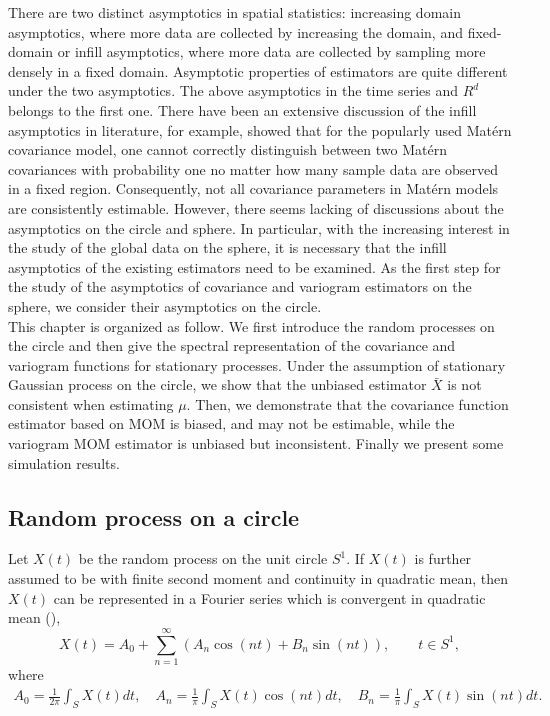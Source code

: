 There are two distinct asymptotics in spatial statistics: increasing domain asymptotics, where more data are collected by increasing the domain, and fixed-domain or infill asymptotics, where more data are collected by sampling more densely in a fixed domain. Asymptotic properties of estimators are quite different under the two asymptotics. The above asymptotics in the time series and $R^d$ belongs to the first one. There have been an extensive discussion of the infill asymptotics in literature, for example, \cite{Zhang:2004:IEA} showed that for the popularly used Mat\'{e}rn covariance model, one cannot correctly distinguish between two Mat\'{e}rn covariances with probability one no matter how many sample data are observed in a fixed region. Consequently, not all covariance parameters in Mat\'{e}rn models are consistently estimable. However, there seems lacking of discussions about the asymptotics on the circle and sphere. In particular, with the increasing interest in the study of the global data on the sphere, it is necessary that the infill asymptotics of the existing estimators need to be examined. As the first step for the study of the asymptotics of covariance and variogram estimators on the sphere, we consider their asymptotics on the circle. \\

This chapter is organized as follow. We first introduce the random processes on the circle and then give the spectral representation of the covariance and variogram functions for stationary processes. Under the assumption of stationary Gaussian process on the circle, we show that the unbiased estimator $\bar{X}$ is not consistent when estimating $\mu$. Then, we demonstrate that the covariance function estimator based on MOM is biased, and may not be estimable, while the variogram MOM estimator is unbiased but inconsistent. Finally we present some simulation results.


\subsection{Random process on a circle}


Let $X(t)$ be the random process on the unit circle $S^1$. If $X(t)$ is further assumed to be with finite second moment and continuity in quadratic mean, then $X(t)$ can be represented in a Fourier series which is convergent in quadratic mean (\cite{DUFOUR1976107}),
\[
X(t) = A_0 + \sum_{n=1}^\infty (A_n\cos(nt) + B_n \sin(nt)), \quad \quad t \in S^1,
\]
where
\begin{eqnarray*}
A_0 = \frac{1}{2\pi}\int_S X(t)dt, \quad A_n = \frac{1}{\pi}\int_S X(t)\cos(nt)dt, \quad B_n = \frac{1}{\pi}\int_S X(t)\sin(nt)dt.
\end{eqnarray*}

